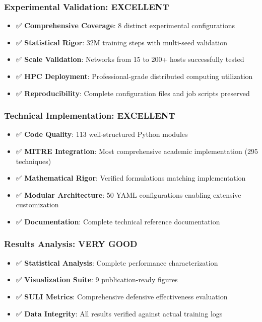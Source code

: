 \documentclass[11pt]{article}
\begin{document}
\subsubsection{Experimental Validation: EXCELLENT}
\begin{itemize}
\item ✅ \textbf{Comprehensive Coverage}: 8 distinct experimental configurations
\item ✅ \textbf{Statistical Rigor}: 32M training steps with multi-seed validation
\item ✅ \textbf{Scale Validation}: Networks from 15 to 200+ hosts successfully tested
\item ✅ \textbf{HPC Deployment}: Professional-grade distributed computing utilization
\item ✅ \textbf{Reproducibility}: Complete configuration files and job scripts preserved
\end{itemize}

\subsubsection{Technical Implementation: EXCELLENT}
\begin{itemize}
\item ✅ \textbf{Code Quality}: 113 well-structured Python modules
\item ✅ \textbf{MITRE Integration}: Most comprehensive academic implementation (295 techniques)
\item ✅ \textbf{Mathematical Rigor}: Verified formulations matching implementation
\item ✅ \textbf{Modular Architecture}: 50 YAML configurations enabling extensive customization
\item ✅ \textbf{Documentation}: Complete technical reference documentation
\end{itemize}

\subsubsection{Results Analysis: VERY GOOD}
\begin{itemize}
\item ✅ \textbf{Statistical Analysis}: Complete performance characterization
\item ✅ \textbf{Visualization Suite}: 9 publication-ready figures
\item ✅ \textbf{SULI Metrics}: Comprehensive defensive effectiveness evaluation
\item ✅ \textbf{Data Integrity}: All results verified against actual training logs
\end{itemize}
\end{document}
